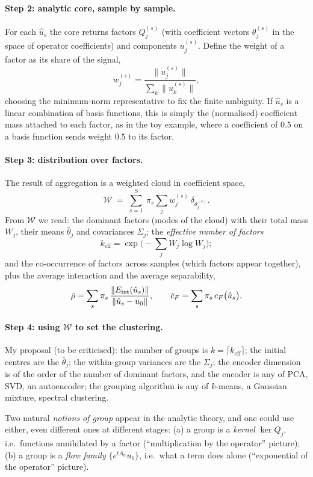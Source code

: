 \paragraph{Step 2: analytic core, sample by sample.}
For each $\hat u_s$ the core returns factors $Q^{(s)}_j$ (with coefficient vectors $\theta^{(s)}_j$ in the space of operator coefficients) and components $u^{(s)}_j$. Define the weight of a factor as its share of the signal,
\[
w^{(s)}_j=\frac{\|u^{(s)}_j\|}{\sum_k\|u^{(s)}_k\|},
\]
choosing the minimum-norm representative to fix the finite ambiguity. If $\hat u_s$ is a linear combination of basis functions, this is simply the (normalised) coefficient mass attached to each factor, as in the toy example, where a coefficient of $0.5$ on a basis function sends weight $0.5$ to its factor.

\paragraph{Step 3: distribution over factors.}
The result of aggregation is a weighted cloud in coefficient space,
\[
\mathcal W\;=\;\sum_{s=1}^{S}\ \pi_s\sum_{j}w^{(s)}_j\ \delta_{\theta^{(s)}_j}.
\]
From $\mathcal W$ we read: the dominant factors (modes of the cloud) with their total mass $W_j$, their means $\bar\theta_j$ and covariances $\Sigma_j$; the \emph{effective number of factors}
\[
k_{\mathrm{eff}}=\exp\Big(-\sum_j W_j\log W_j\Big);
\]
and the co-occurrence of factors across samples (which factors appear together), plus the average interaction and the average separability,
\[
\bar\rho=\sum_s\pi_s\,\frac{\|E_{\mathrm{int}}(\hat u_s)\|}{\|\hat u_s-u_0\|},\qquad \bar c_F=\sum_s\pi_s\,c_F\big(\hat u_s\big).
\]

\paragraph{Step 4: using $\mathcal W$ to set the clustering.}
My proposal (to be criticised): the number of groups is $k=\lceil k_{\mathrm{eff}}\rceil$; the initial centres are the $\bar\theta_j$; the within-group variances are the $\Sigma_j$; the encoder dimension is of the order of the number of dominant factors, and the encoder is any of PCA, SVD, an autoencoder; the grouping algorithm is any of $k$-means, a Gaussian mixture, spectral clustering.

Two natural \emph{notions of group} appear in the analytic theory, and one could use either, even different ones at different stages: (a) a group is a \emph{kernel} $\ker Q_j$, i.e.\ functions annihilated by a factor (``multiplication by the operator'' picture); (b) a group is a \emph{flow family} $\{e^{tA_n}u_0\}$, i.e.\ what a term does alone (``exponential of the operator'' picture).

